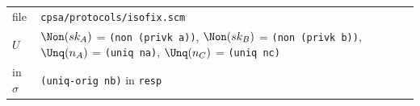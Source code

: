 \par\smallskip\noindent\begin{tabular}{@{}l p{}@{}}
file & \texttt{cpsa/protocols/isofix.scm}\\
$U$ & $\Non(sk_A)$ = \texttt{(non (privk a))}, $\Non(sk_B)$ = \texttt{(non (privk b))}, $\Unq(n_A)$ = \texttt{(uniq na)}, $\Unq(n_C)$ = \texttt{(uniq nc)}\\
in $\sigma$ & \texttt{(uniq-orig nb)} in \texttt{resp}\\
\end{tabular}


